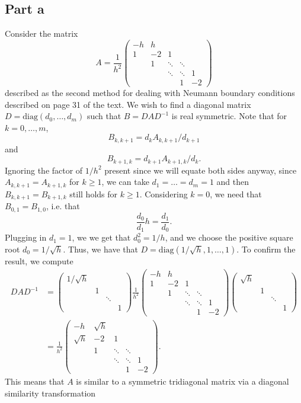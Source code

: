 \documentclass{article}
\begin{document}
\subsection{Part a}
Consider the matrix
\[
A=\frac{1}{h^2} \left( \begin{array}{ccccc}
-h & h  &        &        &      \\
1  & -2 & 1      &        &      \\
   & 1  & \ddots & \ddots &      \\
   &    & \ddots & \ddots & 1    \\
   &    &        & 1      & -2 \end{array} \right)
\]
described as the second method for dealing with Neumann boundary conditions described on page 31 of the text. We wish to find a diagonal matrix $D=\text{diag}(d_0,\ldots,d_m)$ such that $B=DAD^{-1}$ is real symmetric. Note that for $k=0,\ldots,m$, 
\[
B_{k,k+1} = d_{k}A_{k,k+1}/d_{k+1}
\]
and
\[
B_{k+1,k} = d_{k+1}A_{k+1,k}/d_{k}.
\]
Ignoring the factor of $1/h^2$ present since we will equate both sides anyway, since $A_{k,k+1}=A_{k+1,k}$ for $k\geq1$, we can take $d_1=\ldots=d_m=1$ and then $B_{k,k+1}=B_{k+1,k}$ still holds for $k\geq1$. Considering $k=0$, we need that $B_{0,1}=B_{1,0}$, i.e. that 
\[
\frac{d_0}{d_1}h=\frac{d_1}{d_0}.
\]
Plugging in $d_1=1$, we we get that $d_0^2=1/h$, and we choose the positive square root $d_0=1/\sqrt{h}$. Thus, we have that $D=\text{diag}(1/\sqrt{h},1,\ldots,1)$. To confirm the result, we compute 
\begin{align*}
DAD^{-1}&=\begin{pmatrix}
1/\sqrt{h}\\
&1\\
&&\ddots\\
&&&1
\end{pmatrix}\frac{1}{h^2} \left( \begin{array}{ccccc}
-h & h  &        &        &      \\
1  & -2 & 1      &        &      \\
   & 1  & \ddots & \ddots &      \\
   &    & \ddots & \ddots & 1    \\
   &    &        & 1      & -2 \end{array} \right)\begin{pmatrix}
\sqrt{h}\\
&1\\
&&\ddots\\
&&&1
\end{pmatrix}\\&=
\frac{1}{h^2}\left( \begin{array}{ccccc}
-h & \sqrt{h}  &        &        &      \\
\sqrt{h}  & -2 & 1      &        &      \\
   & 1  & \ddots & \ddots &      \\
   &    & \ddots & \ddots & 1    \\
   &    &        & 1      & -2 \end{array} \right).
\end{align*}
This means that $A$ is similar to a symmetric tridiagonal matrix 
via a diagonal similarity transformation
\end{document}

